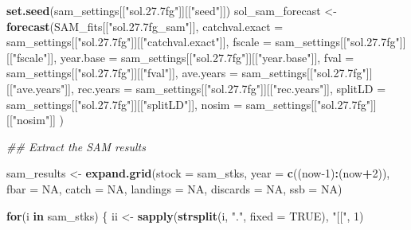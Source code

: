\documentclass[
]{article}
\newenvironment{Shaded}{\begin{snugshade}}{\end{snugshade}}
\newcommand{\CommentTok}[1]{\textcolor[rgb]{0.56,0.35,0.01}{\textit{#1}}}
\newcommand{\ControlFlowTok}[1]{\textcolor[rgb]{0.13,0.29,0.53}{\textbf{#1}}}
\newcommand{\DataTypeTok}[1]{\textcolor[rgb]{0.13,0.29,0.53}{#1}}
\newcommand{\DecValTok}[1]{\textcolor[rgb]{0.00,0.00,0.81}{#1}}
\newcommand{\KeywordTok}[1]{\textcolor[rgb]{0.13,0.29,0.53}{\textbf{#1}}}
\newcommand{\NormalTok}[1]{#1}
\newcommand{\OperatorTok}[1]{\textcolor[rgb]{0.81,0.36,0.00}{\textbf{#1}}}
\newcommand{\OtherTok}[1]{\textcolor[rgb]{0.56,0.35,0.01}{#1}}
\newcommand{\StringTok}[1]{\textcolor[rgb]{0.31,0.60,0.02}{#1}}
\begin{document}
\begin{Shaded}
\begin{Highlighting}[]
{{{        \KeywordTok{set.seed}\NormalTok{(sam_settings[[}\StringTok{"sol.27.7fg"}\NormalTok{]][[}\StringTok{"seed"}\NormalTok{]])}
\NormalTok{        sol_sam_forecast <-}\StringTok{ }\KeywordTok{forecast}\NormalTok{(SAM_fits[[}\StringTok{"sol.27.7fg_sam"}\NormalTok{]],}
                         \DataTypeTok{catchval.exact =}\NormalTok{ sam_settings[[}\StringTok{"sol.27.7fg"}\NormalTok{]][[}\StringTok{"catchval.exact"}\NormalTok{]],}
                         \DataTypeTok{fscale =}\NormalTok{ sam_settings[[}\StringTok{"sol.27.7fg"}\NormalTok{]][[}\StringTok{"fscale"}\NormalTok{]],}
                         \DataTypeTok{year.base =}\NormalTok{ sam_settings[[}\StringTok{"sol.27.7fg"}\NormalTok{]][[}\StringTok{"year.base"}\NormalTok{]],}
                         \DataTypeTok{fval =}\NormalTok{ sam_settings[[}\StringTok{"sol.27.7fg"}\NormalTok{]][[}\StringTok{"fval"}\NormalTok{]],}
                         \DataTypeTok{ave.years =}\NormalTok{ sam_settings[[}\StringTok{"sol.27.7fg"}\NormalTok{]][[}\StringTok{"ave.years"}\NormalTok{]],}
                         \DataTypeTok{rec.years =}\NormalTok{ sam_settings[[}\StringTok{"sol.27.7fg"}\NormalTok{]][[}\StringTok{"rec.years"}\NormalTok{]],}
                         \DataTypeTok{splitLD =}\NormalTok{ sam_settings[[}\StringTok{"sol.27.7fg"}\NormalTok{]][[}\StringTok{"splitLD"}\NormalTok{]],}
                         \DataTypeTok{nosim =}\NormalTok{ sam_settings[[}\StringTok{"sol.27.7fg"}\NormalTok{]][[}\StringTok{"nosim"}\NormalTok{]]}
\NormalTok{        )}

        \CommentTok{## Extract the SAM results}

\NormalTok{        sam_results <-}\StringTok{ }\KeywordTok{expand.grid}\NormalTok{(}\DataTypeTok{stock =}\NormalTok{ sam_stks, }\DataTypeTok{year =} \KeywordTok{c}\NormalTok{((now}\DecValTok{-1}\NormalTok{)}\OperatorTok{:}\NormalTok{(now}\OperatorTok{+}\DecValTok{2}\NormalTok{)), }\DataTypeTok{fbar =} \OtherTok{NA}\NormalTok{, }\DataTypeTok{catch =} \OtherTok{NA}\NormalTok{, }\DataTypeTok{landings =} \OtherTok{NA}\NormalTok{, }\DataTypeTok{discards =} \OtherTok{NA}\NormalTok{,   }\DataTypeTok{ssb =} \OtherTok{NA}\NormalTok{)}

        \ControlFlowTok{for}\NormalTok{(i }\ControlFlowTok{in}\NormalTok{ sam_stks) \{}
\NormalTok{                ii <-}\StringTok{ }\KeywordTok{sapply}\NormalTok{(}\KeywordTok{strsplit}\NormalTok{(i, }\StringTok{"."}\NormalTok{, }\DataTypeTok{fixed =} \OtherTok{TRUE}\NormalTok{), }\StringTok{"[["}\NormalTok{, }\DecValTok{1}\NormalTok{)}

}}}
\end{Highlighting}
\end{Shaded}
\end{document}
